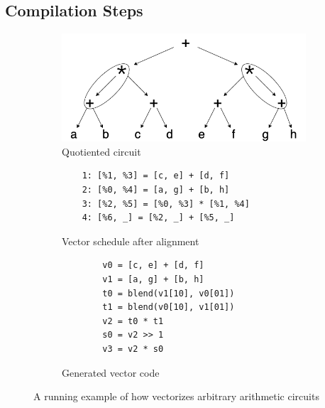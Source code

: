 \subsection{Compilation Steps}
\begin{figure}
    \begin{subfigure}{0.6\columnwidth}
        \includegraphics[width=0.9\linewidth]{figures/compilation_overview/running_example_quotiented.drawio.png}
        \caption{Quotiented circuit}
        \label{fig:quotient-circuit}
    \end{subfigure}
    \begin{subfigure}{0.45\columnwidth}
        \begin{verbatim}
    1: [%1, %3] = [c, e] + [d, f]
    2: [%0, %4] = [a, g] + [b, h]
    3: [%2, %5] = [%0, %3] * [%1, %4]
    4: [%6, _] = [%2, _] + [%5, _]
        \end{verbatim}
        \caption{Vector schedule after alignment}
        \label{fig:aligned-schedule}
    \end{subfigure}
    \begin{subfigure}{0.45\columnwidth}
        \begin{verbatim}
        v0 = [c, e] + [d, f]
        v1 = [a, g] + [b, h]
        t0 = blend(v1[10], v0[01])
        t1 = blend(v0[10], v1[01])
        v2 = t0 * t1
        s0 = v2 >> 1
        v3 = v2 * s0
        \end{verbatim}
        \caption{Generated vector code}
        \label{fig:generated-code}
    \end{subfigure}
    \caption{A running example of how \system vectorizes arbitrary arithmetic circuits}
    \label{fig:toy-running-example}
\end{figure}

